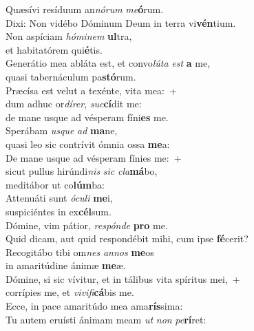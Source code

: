 \evenverse Quæsívi resíduum an\textit{nó}\textit{rum} \textit{me}\textbf{ó}rum.~\*\\
\evenverse Dixi: Non vidébo Dóminum Deum in terra vi\textbf{vén}tium.\\
\oddverse Non aspíciam \textit{hó}\textit{mi}\textit{nem} \textbf{ul}tra,~\*\\
\oddverse et habitatórem qui\textbf{é}tis.\\
\evenverse Generátio mea abláta est, et convo\textit{lú}\textit{ta} \textit{est} \textbf{a} me,~\*\\
\evenverse quasi tabernáculum pa\textbf{stó}rum.\\
\oddverse Præcísa est velut a texénte, vita mea:~+\\
\oddverse  dum adhuc or\textit{dí}\textit{rer}, \textit{suc}\textbf{cí}dit me:~\*\\
\oddverse de mane usque ad vésperam fíni\textbf{es} me.\\
\evenverse Sperábam \textit{us}\textit{que} \textit{ad} \textbf{ma}ne,~\*\\
\evenverse quasi leo sic contrívit ómnia ossa \textbf{me}a:\\
\oddverse De mane usque ad vésperam fínies me:~+\\
\oddverse  sicut pullus hirúndi\textit{nis} \textit{sic} \textit{cla}\textbf{má}bo,~\*\\
\oddverse meditábor ut co\textbf{lúm}ba:\\
\evenverse Attenuáti sunt \textit{ó}\textit{cu}\textit{li} \textbf{me}i,~\*\\
\evenverse suspiciéntes in ex\textbf{cél}sum.\\
\oddverse Dómine, vim pátior, \textit{re}\textit{spón}\textit{de} \textbf{pro} me.~\*\\
\oddverse Quid dicam, aut quid respondébit mihi, cum ipse \textbf{fé}cerit?\\
\evenverse Recogitábo tibi om\textit{nes} \textit{an}\textit{nos} \textbf{me}os~\*\\
\evenverse in amaritúdine ánimæ \textbf{me}æ.\\
\oddverse Dómine, si sic vívitur, et in tálibus vita spíritus mei,~+\\
\oddverse  corrípies me, et \textit{vi}\textit{vi}\textit{fi}\textbf{cá}bis me.~\*\\
\oddverse Ecce, in pace amaritúdo mea ama\textbf{rís}sima:\\
\evenverse Tu autem eruísti ánimam meam \textit{ut} \textit{non} \textit{pe}\textbf{rí}ret:~\*\\
